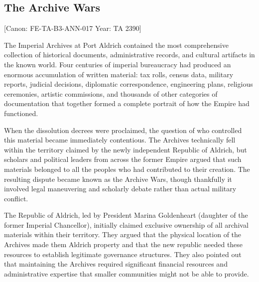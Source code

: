 \subsection{The Archive Wars}\label{the-archive-wars}

{[}Canon: FE-TA-B3-ANN-017 \textbar{} Year: TA 2390{]}

The Imperial Archives at Port Aldrich contained the most comprehensive
collection of historical documents, administrative records, and cultural
artifacts in the known world. Four centuries of imperial bureaucracy had
produced an enormous accumulation of written material: tax rolls, census
data, military reports, judicial decisions, diplomatic correspondence,
engineering plans, religious ceremonies, artistic commissions, and
thousands of other categories of documentation that together formed a
complete portrait of how the Empire had functioned.

When the dissolution decrees were proclaimed, the question of who
controlled this material became immediately contentious. The Archives
technically fell within the territory claimed by the newly independent
Republic of Aldrich, but scholars and political leaders from across the
former Empire argued that such materials belonged to all the peoples who
had contributed to their creation. The resulting dispute became known as
the Archive Wars, though thankfully it involved legal maneuvering and
scholarly debate rather than actual military conflict.

The Republic of Aldrich, led by President Marina Goldenheart (daughter
of the former Imperial Chancellor), initially claimed exclusive
ownership of all archival materials within their territory. They argued
that the physical location of the Archives made them Aldrich property
and that the new republic needed these resources to establish legitimate
governance structures. They also pointed out that maintaining the
Archives required significant financial resources and administrative
expertise that smaller communities might not be able to provide.

